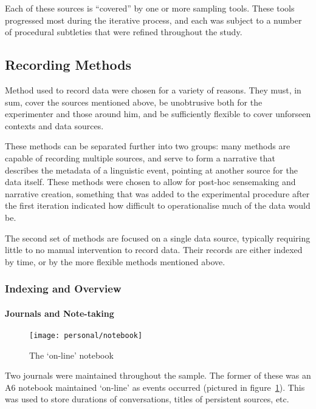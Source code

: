 Each of these sources is ``covered'' by one or more sampling tools.  These tools progressed most during the iterative process, and each was subject to a number of procedural subtleties that were refined throughout the study.










\subsection{Recording Methods}
Method used to record data were chosen for a variety of reasons.  They must, in sum, cover the sources mentioned above, be unobtrusive both for the experimenter and those around him, and be sufficiently flexible to cover unforseen contexts and data sources.

These methods can be separated further into two groups: many methods are capable of recording multiple sources, and serve to form a narrative that describes the metadata of a linguistic event, pointing at another source for the data itself.  These methods were chosen to allow for post-hoc sensemaking and narrative creation, something that was added to the experimental procedure after the first iteration indicated how difficult to operationalise much of the data would be.

The second set of methods are focused on a single data source, typically requiring little to no manual intervention to record data.  Their records are either indexed by time, or by the more flexible methods mentioned above.


\subsubsection{Indexing and Overview}
\paragraph{Journals and Note-taking}

\begin{figure}[p]
    \centering
    \texttt{[image: personal/notebook]}
    \caption{The `on-line' notebook}
    \label{fig:personal:online_notebook}
\end{figure}

Two journals were maintained throughout the sample.  The former of these was an A6 notebook maintained `on-line' as events occurred (pictured in figure~\ref{fig:personal:online_notebook}).  This was used to store durations of conversations, titles of persistent sources, etc.

